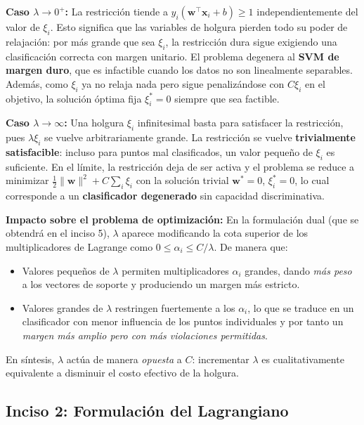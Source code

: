 \documentclass[spanish]{article}
\begin{document}
\textbf{Caso $\lambda \to 0^{+}$:} La restricción tiende a $y_i(\mathbf{w}^\top \mathbf{x}_i + b) \geq 1$ independientemente del valor de $\xi_i$. Esto significa que las variables de holgura pierden todo su poder de relajación: por más grande que sea $\xi_i$, la restricción dura sigue exigiendo una clasificación correcta con margen unitario. El problema degenera al \textbf{SVM de margen duro}, que es infactible cuando los datos no son linealmente separables. Además, como $\xi_i$ ya no relaja nada pero sigue penalizándose con $C\xi_i$ en el objetivo, la solución óptima fija $\xi_i^* = 0$ siempre que sea factible.

\textbf{Caso $\lambda \to \infty$:} Una holgura $\xi_i$ infinitesimal basta para satisfacer la restricción, pues $\lambda \xi_i$ se vuelve arbitrariamente grande. La restricción se vuelve \textbf{trivialmente satisfacible}: incluso para puntos mal clasificados, un valor pequeño de $\xi_i$ es suficiente. En el límite, la restricción deja de ser activa y el problema se reduce a minimizar $\tfrac{1}{2}\|\mathbf{w}\|^2 + C\sum_i \xi_i$ con la solución trivial $\mathbf{w}^* = 0$, $\xi_i^* = 0$, lo cual corresponde a un \textbf{clasificador degenerado} sin capacidad discriminativa.

\textbf{Impacto sobre el problema de optimización:} En la formulación dual (que se obtendrá en el inciso 5), $\lambda$ aparece modificando la cota superior de los multiplicadores de Lagrange como $0 \leq \alpha_i \leq C/\lambda$. De manera que:
\begin{itemize}
    \item Valores pequeños de $\lambda$ permiten multiplicadores $\alpha_i$ grandes, dando \emph{más peso} a los vectores de soporte y produciendo un margen más estricto.
    \item Valores grandes de $\lambda$ restringen fuertemente a los $\alpha_i$, lo que se traduce en un clasificador con menor influencia de los puntos individuales y por tanto un \emph{margen más amplio pero con más violaciones permitidas}.
\end{itemize}

En síntesis, $\lambda$ actúa de manera \emph{opuesta} a $C$: incrementar $\lambda$ es cualitativamente equivalente a disminuir el costo efectivo de la holgura.

\subsection{Inciso 2: Formulación del Lagrangiano}
\end{document}
